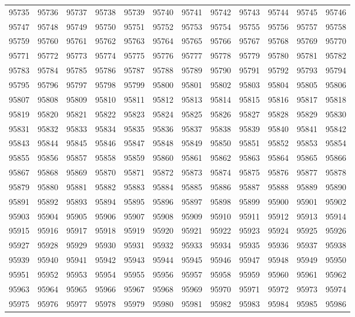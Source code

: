 \begin{center}
\begin{longtable}{llllllllllll}
95735 &95736 &95737 &95738 &95739 &95740 &95741 &95742 &95743 &95744 &95745 &95746 \\
95747 &95748 &95749 &95750 &95751 &95752 &95753 &95754 &95755 &95756 &95757 &95758 \\
95759 &95760 &95761 &95762 &95763 &95764 &95765 &95766 &95767 &95768 &95769 &95770 \\
95771 &95772 &95773 &95774 &95775 &95776 &95777 &95778 &95779 &95780 &95781 &95782 \\
95783 &95784 &95785 &95786 &95787 &95788 &95789 &95790 &95791 &95792 &95793 &95794 \\
95795 &95796 &95797 &95798 &95799 &95800 &95801 &95802 &95803 &95804 &95805 &95806 \\
95807 &95808 &95809 &95810 &95811 &95812 &95813 &95814 &95815 &95816 &95817 &95818 \\
95819 &95820 &95821 &95822 &95823 &95824 &95825 &95826 &95827 &95828 &95829 &95830 \\
95831 &95832 &95833 &95834 &95835 &95836 &95837 &95838 &95839 &95840 &95841 &95842 \\
95843 &95844 &95845 &95846 &95847 &95848 &95849 &95850 &95851 &95852 &95853 &95854 \\
95855 &95856 &95857 &95858 &95859 &95860 &95861 &95862 &95863 &95864 &95865 &95866 \\
95867 &95868 &95869 &95870 &95871 &95872 &95873 &95874 &95875 &95876 &95877 &95878 \\
95879 &95880 &95881 &95882 &95883 &95884 &95885 &95886 &95887 &95888 &95889 &95890 \\
95891 &95892 &95893 &95894 &95895 &95896 &95897 &95898 &95899 &95900 &95901 &95902 \\
95903 &95904 &95905 &95906 &95907 &95908 &95909 &95910 &95911 &95912 &95913 &95914 \\
95915 &95916 &95917 &95918 &95919 &95920 &95921 &95922 &95923 &95924 &95925 &95926 \\
95927 &95928 &95929 &95930 &95931 &95932 &95933 &95934 &95935 &95936 &95937 &95938 \\
95939 &95940 &95941 &95942 &95943 &95944 &95945 &95946 &95947 &95948 &95949 &95950 \\
95951 &95952 &95953 &95954 &95955 &95956 &95957 &95958 &95959 &95960 &95961 &95962 \\
95963 &95964 &95965 &95966 &95967 &95968 &95969 &95970 &95971 &95972 &95973 &95974 \\
95975 &95976 &95977 &95978 &95979 &95980 &95981 &95982 &95983 &95984 &95985 &95986 \\

\end{longtable}
\end{center}
